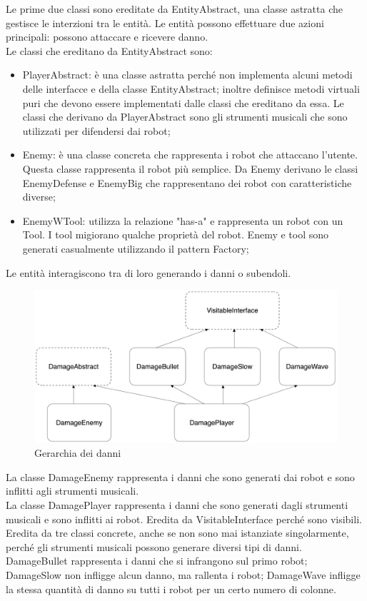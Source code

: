 \documentclass[11pt]{article}
\begin{document}
Le prime due classi sono ereditate da EntityAbstract, una classe astratta 
che gestisce le interzioni tra le entità. Le entità possono effettuare due 
azioni principali: possono attaccare e ricevere danno. \\
Le classi che ereditano da EntityAbstract sono:
\begin{itemize}
	\item PlayerAbstract: è una classe astratta perché non implementa alcuni
		metodi delle interfacce e della classe EntityAbstract; inoltre definisce
		metodi virtuali puri che devono essere implementati dalle classi che
		ereditano da essa. Le classi che derivano da PlayerAbstract sono gli
		strumenti musicali che sono utilizzati per difendersi dai robot;

	\item Enemy: è una classe concreta che rappresenta i robot che attaccano
		l'utente. Questa classe rappresenta il robot più semplice. Da Enemy
		derivano le classi EnemyDefense e EnemyBig che rappresentano dei robot
		con caratteristiche diverse;

	\item EnemyWTool: utilizza la relazione "has-a" e
		rappresenta un robot con un Tool. I tool migiorano qualche proprietà del 
		robot. Enemy e tool sono generati casualmente utilizzando il pattern
		Factory;
\end{itemize}

Le entità interagiscono tra di loro generando i danni o subendoli.

\begin{figure}[ht]
	\centering
	\includegraphics[scale = 0.05]{assets/damage}
	\caption{Gerarchia dei danni}
\end{figure}

La classe DamageEnemy rappresenta i danni che sono generati dai robot e sono
inflitti agli strumenti musicali. \\
La classe DamagePlayer rappresenta i danni che sono generati dagli strumenti
musicali e sono inflitti ai robot. Eredita da VisitableInterface perché
sono visibili. Eredita da tre classi concrete, anche se non sono mai istanziate
singolarmente, perché gli strumenti musicali possono generare diversi tipi di
danni. DamageBullet rappresenta i danni che si infrangono sul primo robot;
DamageSlow non infligge alcun danno, ma rallenta i robot; DamageWave infligge la
stessa quantità di danno su tutti i robot per un certo numero di colonne.
\end{document}
